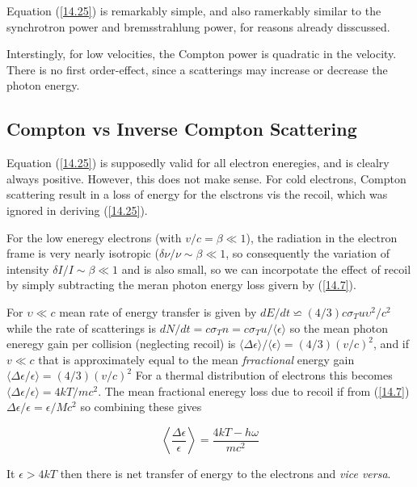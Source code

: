 \documentclass[a4paper,11pt,twoside]{article}
\begin{document}
	Equation (\ref{14.25}) is remarkably simple, and also ramerkably similar to the synchrotron power
	and bremsstrahlung power, for reasons already disscussed.
	
	Interstingly, for low velocities, the Compton power is quadratic in the velocity. There is no first
	order-effect, since a scatterings may increase or decrease the photon energy.
	
	\setcounter{subsection}{3}
	\subsection{Compton vs Inverse Compton Scattering}
	Equation (\ref{14.25}) is supposedly valid for all electron eneregies, and is clealry always positive.
	However, this does not make sense. For cold electrons, Compton scattering result in a loss of energy
	for the elsctrons vis the recoil, which was ignored in deriving (\ref{14.25}).
	
	For the low eneregy electrons (with $ v/c = \beta \ll 1$), the radiation in the electron frame is very
	nearly isotropic ($\delta \nu / \nu \sim \beta \ll 1$, so consequently the variation of intensity $\delta
	I/I \sim \beta \ll 1 $ and is also small, so we can incorpotate the effect of recoil by simply
	subtracting the meran photon energy loss givern by (\ref{14.7}).
	
	For $\upsilon \ll c $ mean rate of energy transfer is given by $ dE/ dt \backsimeq (4/3)c \sigma_{T}
	u \upsilon^2 / c^2 $ while the rate of scatterings is $dN/dt = c \sigma_{T} n = c \sigma_{T} u /
	\langle \epsilon \rangle $ so the mean photon eneregy gain per collision (neglecting recoil) is $
	\langle \Delta \epsilon \rangle / \langle \epsilon \rangle = (4/3)(v/c)^2 $, and if $v \ll c $ that is
	approximately equal to the mean \textit{frractional} energy gain $ \langle \Delta \epsilon /
	\epsilon \rangle = (4/3)(v/c)^2 $ For a thermal distribution of electrons this becomes $\langle \Delta
	\epsilon / \epsilon \rangle = 4kT/ mc^2 $. The mean fractional eneregy loss due to recoil if from
	(\ref{14.7}) $ \Delta \epsilon / \epsilon = \epsilon/ Mc^2 $ so combining these gives
	
	\begin{equation}
	\label{14.26}
	\left\langle \frac{\Delta \epsilon}{\epsilon} \right\rangle = \frac{4kT - h\omega}{m c^2}
	\tag{14.26}
	\end{equation}
	
	It $\epsilon > 4kT $ then there is net transfer of energy to the electrons and \textit{vice versa}.
	
\end{document}
